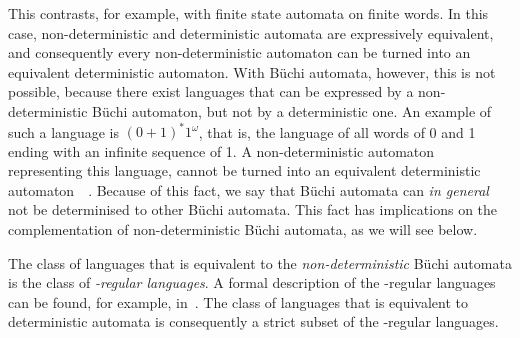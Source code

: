This contrasts, for example, with finite state automata on finite words. In this case, non-deterministic and deterministic automata are expressively equivalent, and consequently every non-deterministic automaton can be turned into an equivalent deterministic automaton. With Büchi automata, however, this is not possible, because there exist languages that can be expressed by a non-deterministic Büchi automaton, but not by a deterministic one. An example of such a language is $(0+1)^*1^\omega$, that is, the language of all words of 0 and 1 ending with an infinite sequence of 1. A non-deterministic automaton representing this language, cannot be turned into an equivalent deterministic automaton~~\cite{1996_vardi, 2002_roggenbach}. Because of this fact, we say that Büchi automata can \textit{in general} not be determinised to other Büchi automata. This fact has implications on the complementation of non-deterministic Büchi automata, as we will see below.

The class of languages that is equivalent to the \textit{non-deterministic} Büchi automata is the class of \textit{\om-regular languages}. A formal description of the \om-regular languages can be found, for example, in~\cite{Thomas:1991,1996_thomas,2014_wilke}. The class of languages that is equivalent to deterministic automata is consequently a strict subset of the \om-regular languages.




